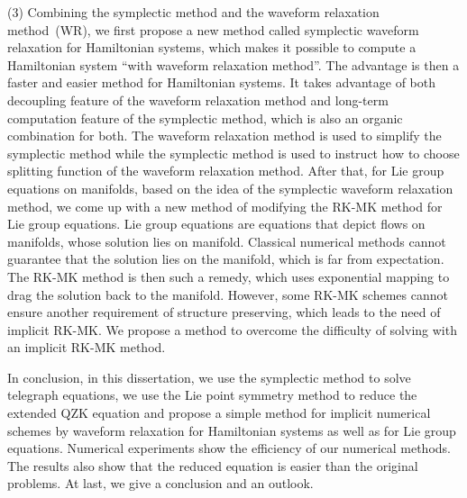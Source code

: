 {(3) Combining the symplectic method and the waveform relaxation method~(WR), we first propose a new method called
symplectic waveform relaxation for Hamiltonian systems, which makes it possible to compute a Hamiltonian system
``with waveform relaxation method''. The advantage is then a faster and easier method for Hamiltonian systems. It takes
advantage of both decoupling feature of the waveform relaxation method and long-term computation
feature of the symplectic method, which is also an organic combination for both. The waveform relaxation method is used to
simplify the symplectic method while the symplectic method is used to instruct how to choose splitting function of the waveform
relaxation method. After that, for Lie group equations on manifolds, based on
the idea of the symplectic waveform relaxation method, we come up with a new method of modifying the RK-MK method
for Lie group equations. Lie group equations are equations that depict flows on manifolds, whose solution lies on manifold.
Classical numerical methods cannot guarantee that the solution lies on the manifold, which is far from expectation.
The RK-MK method is then such a remedy, which uses exponential mapping to drag the solution back to
the manifold. However, some RK-MK schemes cannot ensure another requirement of structure preserving,
which leads to the need of implicit RK-MK. We propose a method to overcome the difficulty of solving with an implicit RK-MK method.

In conclusion, in this dissertation, we use the symplectic method to solve telegraph equations, we use the Lie point symmetry method
to reduce the extended QZK equation and propose a simple method for implicit numerical schemes by waveform relaxation for
Hamiltonian systems as well as for Lie group equations. Numerical experiments show the efficiency of
our numerical methods. The results also show that the reduced equation is easier than the original problems. At last, we give a conclusion
and an outlook.

}
